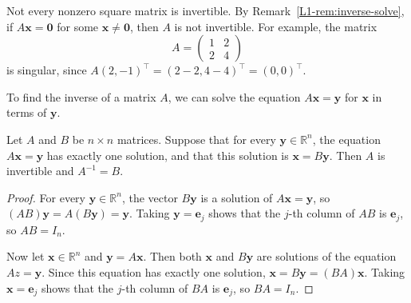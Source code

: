 \begin{example}\label{L1-ex:singular}
    Not every nonzero square matrix is invertible. By Remark~\ref{L1-rem:inverse-solve}, if $A\mathbf{x} = \mathbf{0}$ for some $\mathbf{x} \neq \mathbf{0}$, then $A$ is not invertible. For example, the matrix
    \[A = \begin{pmatrix}
        1 & 2 \\
        2 & 4
    \end{pmatrix}\]
    is singular, since $A(2, -1)^\top = (2 - 2, 4 - 4)^\top = (0, 0)^\top$.
\end{example}

To find the inverse of a matrix $A$, we can solve the equation $A\mathbf{x} = \mathbf{y}$ for $\mathbf{x}$ in terms of $\mathbf{y}$.

\begin{proposition}\label{L1-prop:find-inverse}
    Let $A$ and $B$ be $n \times n$ matrices. Suppose that for every $\mathbf{y} \in \mathbb{R}^n$, the equation $A\mathbf{x} = \mathbf{y}$ has exactly one solution, and that this solution is $\mathbf{x} = B\mathbf{y}$. Then $A$ is invertible and $A^{-1} = B$.
\end{proposition}

\begin{proof}
    For every $\mathbf{y} \in \mathbb{R}^n$, the vector $B\mathbf{y}$ is a solution of $A\mathbf{x} = \mathbf{y}$, so $(AB)\mathbf{y} = A(B\mathbf{y}) = \mathbf{y}$. Taking $\mathbf{y} = \mathbf{e}_j$ shows that the $j$-th column of $AB$ is $\mathbf{e}_j$, so $AB = I_n$.

    Now let $\mathbf{x} \in \mathbb{R}^n$ and $\mathbf{y} = A\mathbf{x}$. Then both $\mathbf{x}$ and $B\mathbf{y}$ are solutions of the equation $Az = \mathbf{y}$. Since this equation has exactly one solution, $\mathbf{x} = B\mathbf{y} = (BA)\mathbf{x}$. Taking $\mathbf{x} = \mathbf{e}_j$ shows that the $j$-th column of $BA$ is $\mathbf{e}_j$, so $BA = I_n$.
\end{proof}

